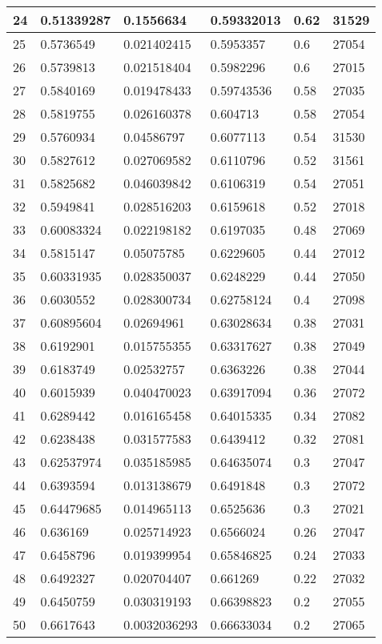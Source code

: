 \begin{longtable}{|l|l|l|l|l|l|}
24 & 0.51339287 & 0.1556634 & 0.59332013 & 0.62 & 31529 \\ \hline 
25 & 0.5736549 & 0.021402415 & 0.5953357 & 0.6 & 27054 \\ \hline 
26 & 0.5739813 & 0.021518404 & 0.5982296 & 0.6 & 27015 \\ \hline 
27 & 0.5840169 & 0.019478433 & 0.59743536 & 0.58 & 27035 \\ \hline 
28 & 0.5819755 & 0.026160378 & 0.604713 & 0.58 & 27054 \\ \hline 
29 & 0.5760934 & 0.04586797 & 0.6077113 & 0.54 & 31530 \\ \hline 
30 & 0.5827612 & 0.027069582 & 0.6110796 & 0.52 & 31561 \\ \hline 
31 & 0.5825682 & 0.046039842 & 0.6106319 & 0.54 & 27051 \\ \hline 
32 & 0.5949841 & 0.028516203 & 0.6159618 & 0.52 & 27018 \\ \hline 
33 & 0.60083324 & 0.022198182 & 0.6197035 & 0.48 & 27069 \\ \hline 
34 & 0.5815147 & 0.05075785 & 0.6229605 & 0.44 & 27012 \\ \hline 
35 & 0.60331935 & 0.028350037 & 0.6248229 & 0.44 & 27050 \\ \hline 
36 & 0.6030552 & 0.028300734 & 0.62758124 & 0.4 & 27098 \\ \hline 
37 & 0.60895604 & 0.02694961 & 0.63028634 & 0.38 & 27031 \\ \hline 
38 & 0.6192901 & 0.015755355 & 0.63317627 & 0.38 & 27049 \\ \hline 
39 & 0.6183749 & 0.02532757 & 0.6363226 & 0.38 & 27044 \\ \hline 
40 & 0.6015939 & 0.040470023 & 0.63917094 & 0.36 & 27072 \\ \hline 
41 & 0.6289442 & 0.016165458 & 0.64015335 & 0.34 & 27082 \\ \hline 
42 & 0.6238438 & 0.031577583 & 0.6439412 & 0.32 & 27081 \\ \hline 
43 & 0.62537974 & 0.035185985 & 0.64635074 & 0.3 & 27047 \\ \hline 
44 & 0.6393594 & 0.013138679 & 0.6491848 & 0.3 & 27072 \\ \hline 
45 & 0.64479685 & 0.014965113 & 0.6525636 & 0.3 & 27021 \\ \hline 
46 & 0.636169 & 0.025714923 & 0.6566024 & 0.26 & 27047 \\ \hline 
47 & 0.6458796 & 0.019399954 & 0.65846825 & 0.24 & 27033 \\ \hline 
48 & 0.6492327 & 0.020704407 & 0.661269 & 0.22 & 27032 \\ \hline 
49 & 0.6450759 & 0.030319193 & 0.66398823 & 0.2 & 27055 \\ \hline 
50 & 0.6617643 & 0.0032036293 & 0.66633034 & 0.2 & 27065 \\ \hline 
\end{longtable}